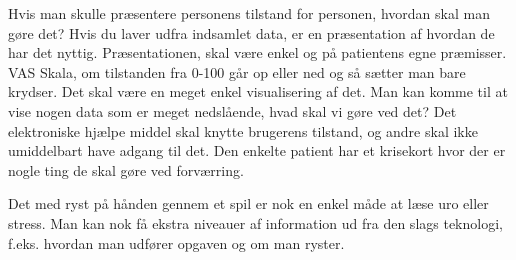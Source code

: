 Hvis man skulle præsentere personens tilstand for personen, hvordan skal man gøre det? Hvis du laver udfra indsamlet data, er en præsentation af hvordan de har det nyttig. Præsentationen, skal være enkel og på patientens egne præmisser. VAS Skala, om tilstanden fra 0-100 går op eller ned og så sætter man bare krydser. Det skal være en meget enkel visualisering af det. 
Man kan komme til at vise nogen data som er meget nedslående, hvad skal vi gøre ved det? Det elektroniske hjælpe middel skal knytte brugerens tilstand, og andre skal ikke umiddelbart have adgang til det. Den enkelte patient har et krisekort hvor der er nogle ting de skal gøre ved forværring.

Det med ryst på hånden gennem et spil er nok en enkel måde at læse uro eller stress. Man kan nok få ekstra niveauer af information ud fra den slags teknologi, f.eks. hvordan man udfører opgaven og om man ryster. 